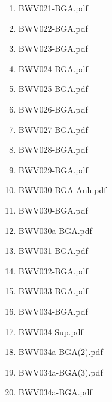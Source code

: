 \documentclass[11pt]{article}
\begin{document}
\begin{enumerate}
\begin{enumerate}
\begin{enumerate}
\item BWV021-BGA.pdf
\label{sec-1-1-1-1-44-6-7-1-22}

\item BWV022-BGA.pdf
\label{sec-1-1-1-1-44-6-7-1-23}

\item BWV023-BGA.pdf
\label{sec-1-1-1-1-44-6-7-1-24}

\item BWV024-BGA.pdf
\label{sec-1-1-1-1-44-6-7-1-25}

\item BWV025-BGA.pdf
\label{sec-1-1-1-1-44-6-7-1-26}

\item BWV026-BGA.pdf
\label{sec-1-1-1-1-44-6-7-1-27}

\item BWV027-BGA.pdf
\label{sec-1-1-1-1-44-6-7-1-28}

\item BWV028-BGA.pdf
\label{sec-1-1-1-1-44-6-7-1-29}

\item BWV029-BGA.pdf
\label{sec-1-1-1-1-44-6-7-1-30}

\item BWV030-BGA-Anh.pdf
\label{sec-1-1-1-1-44-6-7-1-31}

\item BWV030-BGA.pdf
\label{sec-1-1-1-1-44-6-7-1-32}

\item BWV030a-BGA.pdf
\label{sec-1-1-1-1-44-6-7-1-33}

\item BWV031-BGA.pdf
\label{sec-1-1-1-1-44-6-7-1-34}

\item BWV032-BGA.pdf
\label{sec-1-1-1-1-44-6-7-1-35}

\item BWV033-BGA.pdf
\label{sec-1-1-1-1-44-6-7-1-36}

\item BWV034-BGA.pdf
\label{sec-1-1-1-1-44-6-7-1-37}

\item BWV034-Sup.pdf
\label{sec-1-1-1-1-44-6-7-1-38}

\item BWV034a-BGA(2).pdf
\label{sec-1-1-1-1-44-6-7-1-39}

\item BWV034a-BGA(3).pdf
\label{sec-1-1-1-1-44-6-7-1-40}

\item BWV034a-BGA.pdf
\label{sec-1-1-1-1-44-6-7-1-41}


\end{enumerate}
\end{enumerate}
\end{enumerate}
\end{document}
